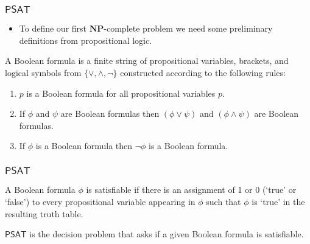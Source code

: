 \documentclass[handout]{beamer}
\newcommand{\NP}{\mathbf{NP}}
\newcommand{\SAT}{\mathsf{PSAT}}
\begin{document}
\begin{frame}
\frametitle{$\SAT$}
\begin{itemize}
\item To define our first $\NP$-complete problem we need some preliminary definitions from propositional logic.
\end{itemize} 
\begin{definition}
A Boolean formula is a finite string of propositional variables, brackets, and logical symbols from $\{\vee,\wedge,\neg\}$ constructed according to the following rules:
\begin{enumerate}
\item $p$ is a Boolean formula for all propositional variables $p$.
\item If $\phi$ and $\psi$ are Boolean formulas then $(\phi\vee\psi)$ and $(\phi\wedge\psi)$ are Boolean formulas.
\item If $\phi$ is a Boolean formula then $\neg\phi$ is a Boolean formula.
\end{enumerate} 
\end{definition}
\end{frame}

\begin{frame}
\frametitle{$\SAT$}

\begin{definition}[Satisfiable]
A Boolean formula $\phi$ is satisfiable if there is an assignment of 1 or 0 (`true' or `false') to every propositional variable appearing in $\phi$ such that $\phi$ is `true' in the resulting truth table.
\end{definition}
\vspace{1cm}
\begin{definition}[$\SAT$]
$\SAT$ is the decision problem that asks if a given Boolean formula is satisfiable.
\end{definition}

\end{frame}
\end{document}
